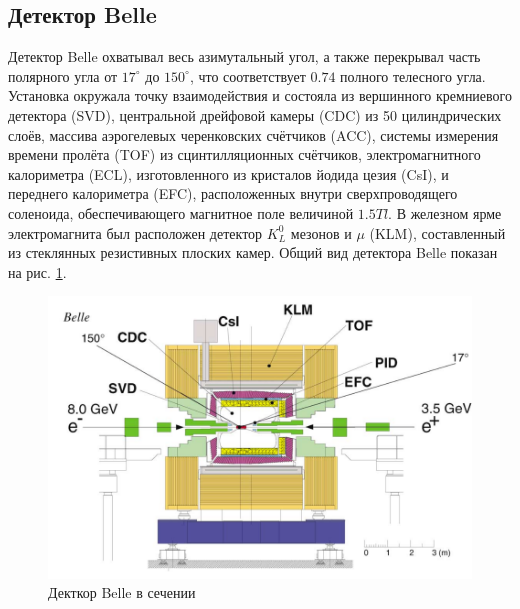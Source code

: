 \subsection{Детектор Belle}

Детектор Belle охватывал весь азимутальный угол, а также перекрывал 
часть полярного угла от $17^{\circ} $ до $150^{\circ} $, что соответствует $0.74$
полного телесного угла. Установка окружала точку взаимодействия и состояла 
из вершинного кремниевого детектора (SVD), центральной дрейфовой 
камеры (CDC) из 50 цилиндрических слоёв, массива аэрогелевых черенковских 
счётчиков (ACC), системы измерения времени пролёта (TOF) из сцинтилляционных 
счётчиков, электромагнитного калориметра (ECL), изготовленного из кристалов 
йодида цезия (CsI), и переднего калориметра (EFC), расположенных внутри 
сверхпроводящего соленоида, обеспечивающего магнитное поле величиной 
$1.5 Tl$. В железном ярме электромагнита был расположен детектор $K_L^0$ мезонов 
и $\mu$ (KLM), составленный из стеклянных резистивных плоских камер. 
Общий вид детектора Belle показан на рис. \ref{the:belle}.
\begin{figure}[H]
    \centering
    \includegraphics[width=0.8\linewidth]{img/the_belle.png}
    \caption{Декткор Belle в сечении}
    \label{the:belle}
\end{figure}



